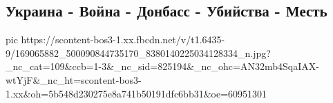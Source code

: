  
 
 
 
 
\subsection{Украина - Война - Донбасс - Убийства - Месть}

\ifcmt
  pic https://scontent-bos3-1.xx.fbcdn.net/v/t1.6435-9/169065882_500090844735170_8380140225034128334_n.jpg?_nc_cat=109&ccb=1-3&_nc_sid=825194&_nc_ohc=AN32mb4SqaIAX-wtYjF&_nc_ht=scontent-bos3-1.xx&oh=5b548d230275e8a741b50191dfc6bb31&oe=60951301
\fi
